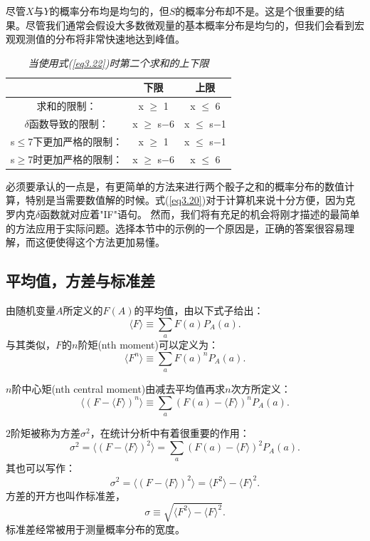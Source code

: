 \documentclass[UTF8]{ctexart}
\numberwithin{equation}{section}%
\numberwithin{figure}{section}%
\begin{document}
    尽管$X$与$Y$的概率分布均是均匀的，但$S$的概率分布却不是。这是个很重要的结果。尽管我们通常会假设大多数微观量的基本概率分布是均匀的，但我们会看到宏观观测值的分布将非常快速地达到峰值。
    \begin{table}[H]
        \centering
        \caption{\textit{当使用式(\ref{eq3.22})时第二个求和的上下限}}
        \label{table3.3}
        {%
        \begin{tabular}{ccc}
        \hline
               \quad        & 下限      & 上限      \\ \hline
        求和的限制：         & x $\geq$ 1   & x $\leq$ 6   \\ \hline
        $\delta$函数导致的限制： & x $\geq$ s−6 & x $\leq$ s−1 \\ \hline
        s$\leq$7下更加严格的限制： & x $\geq$ 1   & x $\leq$ s−1 \\ \hline
        s$\geq$7时更加严格的限制： & x $\geq$ s−6 & x $\leq$ 6   \\ \hline
        \end{tabular}%
        }
        \end{table}
    必须要承认的一点是，有更简单的方法来进行两个骰子之和的概率分布的数值计算，特别是当需要数值解的时候。式(\ref{eq3.20})对于计算机来说十分方便，因为克罗内克$\delta$函数就对应着"IF"语句。
    然而，我们将有充足的机会将刚才描述的最简单的方法应用于实际问题。选择本节中的示例的一个原因是，正确的答案很容易理解，而这便使得这个方法更加易懂。
        
    \subsection{平均值，方差与标准差}
    由随机变量$A$所定义的$F(A)$的平均值，由以下式子给出：
    \begin{equation}
        \langle{F}\rangle\equiv\sum_aF(a)P_A(a).
    \end{equation}
    与其类似，$F$的$n$阶矩(nth moment)可以定义为：
    \begin{equation}
        \langle{F^n}\rangle\equiv\sum_aF(a)^nP_A(a).
    \end{equation}
    
    $n$阶中心矩(nth central moment)由减去平均值再求$n$次方所定义：
    \begin{equation}
        \langle{(F-\langle{F}\rangle)^n}\rangle\equiv\sum_a(F(a)-\langle{F}\rangle)^nP_A(a).
    \end{equation}
    
    $2$阶矩被称为方差$\sigma^2$，在统计分析中有着很重要的作用：
    \begin{equation}
        \sigma^2=\langle{(F-\langle{F}\rangle)^2}\rangle=\sum_a(F(a)-\langle{F}\rangle)^2P_A(a).
    \end{equation}
    其也可以写作：
    \begin{equation}
        \sigma^2=\langle{(F-\langle{F}\rangle)^2}\rangle=\langle{F^2}\rangle-\langle{F}\rangle^2.
    \end{equation}
    方差的开方也叫作标准差，
    \begin{equation}
        \sigma\equiv\sqrt{\langle{F^2}\rangle-\langle{F}\rangle^2}.
    \end{equation}
    标准差经常被用于测量概率分布的宽度。
\end{document}
